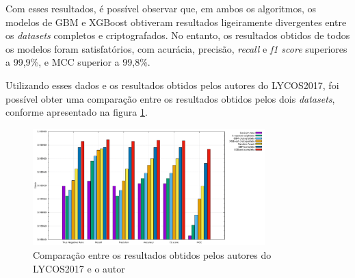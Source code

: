 \documentclass[12pt]{article}
\begin{document}
\begin{table}[h!]
    \caption{Resultados obtidos pelo autor}
    \label{tab:resultados}
\end{table}

Com esses resultados, é possível observar que, em ambos os algoritmos, os modelos de GBM e XGBoost obtiveram resultados ligeiramente divergentes entre os \emph{datasets} completos e criptografados. No entanto, os resultados obtidos de todos os modelos foram satisfatórios, com acurácia, precisão, \emph{recall} e \emph{f1 score} superiores a 99,9\%, e MCC superior a 99,8\%.

Utilizando esses dados e os resultados obtidos pelos autores do LYCOS2017, foi possível obter uma comparação entre os resultados obtidos pelos dois \emph{datasets}, conforme apresentado na figura \ref{fig:model_comparison}.

\begin{figure}[h!]
    \centering
    \includegraphics[width=0.8\textwidth]{figures/model_comparison.pdf}
    \caption{Comparação entre os resultados obtidos pelos autores do LYCOS2017 e o autor}
    \label{fig:model_comparison}
\end{figure}
\end{document}
